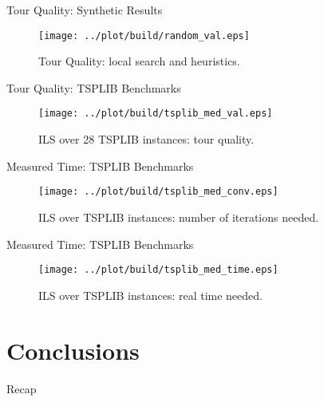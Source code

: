 \documentclass[
  size=8pt,
  style=klope,
  paper=screen,
  mode=present,
  nohandoutpagebreaks,
  pauseslide,
  hlsections,
  fleqn,
]{powerdot}
\begin{document}
\begin{slide}[toc=Benchmarks: Solutions]{Tour Quality: Synthetic Results}
  \begin{figure}[H]
    \centering
    \texttt{[image: ../plot/build/random\_val.eps]}
    \caption{Tour Quality: local search and heuristics.}
  \end{figure}
\end{slide}

\begin{slide}[toc=]{Tour Quality: TSPLIB Benchmarks}
  \begin{figure}[H]
    \centering
    \texttt{[image: ../plot/build/tsplib\_med\_val.eps]}
    \caption{ILS over 28 TSPLIB instances: tour quality.}
  \end{figure}
\end{slide}

\begin{slide}[toc=]{Measured Time: TSPLIB Benchmarks}
  \begin{figure}[H]
    \centering
    \texttt{[image: ../plot/build/tsplib\_med\_conv.eps]}
    \caption{ILS over TSPLIB instances: number of iterations needed.}
  \end{figure}
\end{slide}

\begin{slide}[toc=]{Measured Time: TSPLIB Benchmarks}
  \begin{figure}[H]
    \centering
    \texttt{[image: ../plot/build/tsplib\_med\_time.eps]}
    \caption{ILS over TSPLIB instances: real time needed.}
  \end{figure}
\end{slide}

\section[template=wideslide]{Conclusions}

\begin{slide}[toc=Recap]{Recap}
\tableofcontents[content=all,type=0]
\end{slide}
\end{document}
